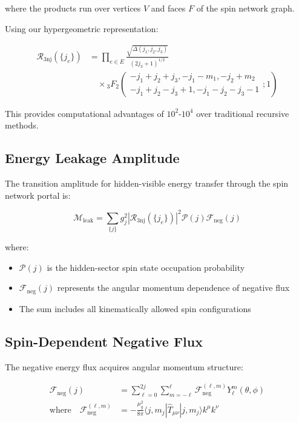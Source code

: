 \documentclass[12pt]{article}
\begin{document}
where the products run over vertices $V$ and faces $F$ of the spin network graph.

Using our hypergeometric representation:

\begin{align}
\mathcal{R}_{\text{3nj}}(\{j_e\}) &= \prod_{e \in E} \frac{\sqrt{\Delta(j_1, j_2, j_3)}}{(2j_3 + 1)^{1/2}} \\
&\quad \times {}_3F_2\left(\begin{array}{c} -j_1+j_2+j_3, -j_1-m_1, -j_2+m_2 \\ -j_1+j_2-j_3+1, -j_1-j_2-j_3-1 \end{array}; 1\right)
\end{align}

This provides computational advantages of $10^2$-$10^4$ over traditional recursive methods.

\subsection{Energy Leakage Amplitude}

The transition amplitude for hidden-visible energy transfer through the spin network portal is:

\begin{equation}
\mathcal{M}_{\text{leak}} = \sum_{\{j\}} g_j^2 \left|\mathcal{R}_{\text{3nj}}(\{j_e\})\right|^2 \mathcal{P}(j) \mathcal{F}_{\text{neg}}(j)
\end{equation}

where:
\begin{itemize}
\item $\mathcal{P}(j)$ is the hidden-sector spin state occupation probability
\item $\mathcal{F}_{\text{neg}}(j)$ represents the angular momentum dependence of negative flux
\item The sum includes all kinematically allowed spin configurations
\end{itemize}

\subsection{Spin-Dependent Negative Flux}

The negative energy flux acquires angular momentum structure:

\begin{align}
\mathcal{F}_{\text{neg}}(j) &= \sum_{\ell=0}^{2j} \sum_{m=-\ell}^{\ell} \mathcal{F}_{\text{neg}}^{(\ell,m)} Y_\ell^m(\theta, \phi) \\
\text{where} \quad \mathcal{F}_{\text{neg}}^{(\ell,m)} &= -\frac{\mu_g^2}{8\pi} \langle j, m_j | \hat{T}_{\mu\nu} | j, m_j \rangle k^\mu k^\nu
\end{align}
\end{document}
